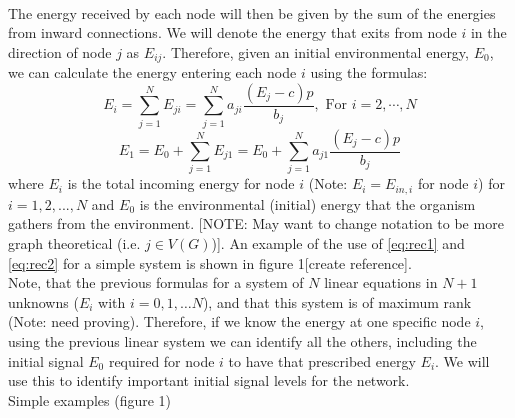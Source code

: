 \documentclass{amsart}
\theoremstyle{plain}
\numberwithin{equation}{section}
\begin{document}
\\
The energy received by each node will then be given by the sum of the energies from inward connections. We will denote the energy that exits from node $i$ in the direction of node $j$ as $E_{ij}$. Therefore, given an initial environmental energy, $E_0$, we can calculate the energy entering each node $i$ using the formulas: 
\begin{equation}\label{eq:rec1}
E_i=\sum_{j=1}^N E_{ji}=\sum_{j=1}^N a_{ji}\frac{(E_j-c)p}{b_j}, \text{ For } i=2,\cdots, N 
\end{equation}
\begin{equation}\label{eq:rec2}
E_1=E_0+\sum_{j=1}^N E_{j1}=E_0+\sum_{j=1}^N a_{j1}\frac{(E_j-c)p}{b_j}
\end{equation}
where $E_i$ is the total incoming energy for node $i$ (Note: $E_i=E_{in, i}$ for node $i$) for $i=1,2,...,N$ and $E_0$ is the environmental (initial) energy that the organism gathers from the environment. [NOTE: May want to change notation to be more graph theoretical (i.e. $j\in V(G)$)]. An example of the use of \ref{eq:rec1} and \ref{eq:rec2} for a simple system is shown in figure 1[create reference]. 
\\
Note, that the previous formulas for a system of $N$ linear equations in $N+1$ unknowns ($E_i$ with $i=0,1,\ldots N$), and that this system is of maximum rank (Note: need proving). Therefore, if we know the  energy at one specific node $i$, using the previous linear system we can identify all the others, including the initial signal $E_0$ required for node $i$ to have that prescribed energy $E_i$. We will use this to identify important initial signal levels for the network.
\\
Simple examples (figure 1)\\
\end{document}
